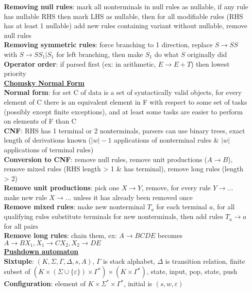 \documentclass[a4paper]{article}
\begin{document}
\begin{multicols}{2}
        \textbf{Removing null rules}: mark all nonterminals in null rules as nullable, if any rule has nullable RHS then mark LHS as nullable, then for all modifiable rules (RHS has at least 1 nullable) add new rules containing variant without nullable, remove null rules\\
        \textbf{Removing symmetric rules}: force branching to 1 direction, replace $S \to SS$ with $S \to SS_1 | S_1$ for left branching, then make $S_1$ do what $S$ originally did\\
        \textbf{Operator order}: if parsed first (ex: in arithmetic, $E \to E + T$) then lowest priority\\
        \underline{\textbf{Chomsky Normal Form}}\\
        \textbf{Normal form}: for set C of data is a set of syntactically valid objects, for every element of C there is an equivalent element in F with respect to some set of tasks (possibly except finite exceptions), and at least some tasks are easier to perform on elements of F than C\\
        \textbf{CNF}: RHS has 1 terminal or 2 nonterminals, parsers can use binary trees, exact length of derivations known ($|w| - 1$ applications of nonterminal rules \& $|w|$ applications of terminal rules)\\
        \textbf{Conversion to CNF}: remove null rules, remove unit productions ($A \to B$), remove mixed rules (RHS length > 1 \& has terminal), remove long rules (length > 2)\\
        \textbf{Remove unit productions}: pick one $X \to Y$, remove, for every rule $Y \to \ldots$ make new rule $X \to \ldots$ unless it has already been removed once\\
        \textbf{Remove mixed rules}: make new nonterminal $T_a$ for each terminal $a$, for all qualifying rules substitute terminals for new nonterminals, then add rules $T_a \to a$ for all pairs\\
        \textbf{Remove long rules}: chain them, ex: $A \to BCDE$ becomes $A \to BX_1, X_1 \to CX_2, X_2 \to DE$\\
        \underline{\textbf{Pushdown automaton}}\\
        \textbf{Sixtuple}: $(K, \Sigma, \Gamma, \Delta, s, A)$, $\Gamma$ is stack alphabet, $\Delta$ is transition relation, finite subset of $(K \times (\Sigma \cup \{\varepsilon\}) \times \Gamma ^*) \times (K \times \Gamma ^*)$, state, input, pop, state, push\\
        \textbf{Configuration}: element of $K \times \Sigma^* \times \Gamma^*$, initial is $(s, w, \varepsilon)$\\

\end{multicols}
\end{document}
